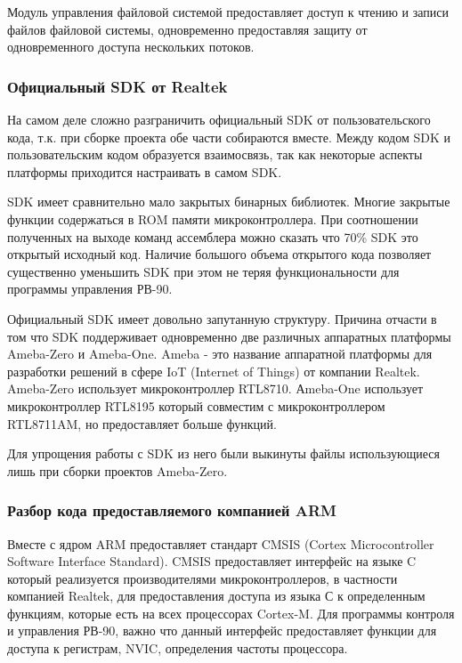 Модуль управления файловой системой предоставляет доступ к чтению и записи файлов файловой системы, одновременно предоставляя защиту от одновременного доступа нескольких потоков. 


\subsubsection{ Официальный SDK от Realtek}
На самом деле сложно разграничить официальный SDK от пользовательского кода, т.к. при сборке проекта обе части собираются вместе.
Между кодом SDK и пользовательским кодом образуется взаимосвязь, так как некоторые аспекты платформы приходится настраивать в самом SDK.

SDK имеет сравнительно мало закрытых бинарных библиотек. Многие закрытые функции содержаться в ROM памяти микроконтроллера. 
При соотношении полученных на выходе команд ассемблера можно сказать что 70\% SDK это открытый исходный код. Наличие большого объема открытого кода позволяет существенно уменьшить SDK при этом не теряя функциональности для программы управления РВ-90.   

Официальный SDK имеет довольно запутанную структуру. Причина отчасти в том что SDK поддерживает одновременно две различных аппаратных платформы Ameba-Zero и Ameba-One. Ameba - это название аппаратной платформы для разработки решений в сфере IoT (Internet of Things) от компании Realtek. Ameba-Zero использует микроконтроллер RTL8710. Аmeba-One использует микроконтроллер RTL8195 который совместим с микроконтроллером RTL8711AM, но предоставляет больше функций.

Для упрощения работы с SDK из него были выкинуты файлы использующиеся лишь при сборки проектов Ameba-Zero.


\subsubsection{ Разбор кода предоставляемого компанией ARM}
Вместе с ядром ARM предоставляет стандарт CMSIS  (Cortex Microcontroller Software Interface Standard).
CMSIS предоставляет интерфейс на языке C который реализуется производителями микроконтроллеров, в частности компанией Realtek, для предоставления доступа из языка С к определенным функциям, которые есть на всех процессорах Cortex-M. Для программы контроля и управления РВ-90, важно что данный интерфейс предоставляет функции для доступа к регистрам, NVIC, определения частоты процессора.


